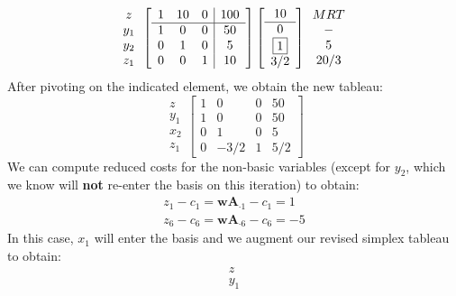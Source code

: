 \begin{example}
\begin{equation}
\begin{array}{c}
z\\
y_1\\
y_2\\
z_1
\end{array}
\left[
\begin{array}{ccc|c}
1	&	10	&	0	&	100\\
\hline
1	&	0	&	0	&	50\\
0	&	1	&	0	&	5\\
0	&	0	&	1	&	10
\end{array}
\right]
\left[
\begin{array}{c}
10\\
\hline
0\\
\fbox{1}\\
3/2
\end{array}
\right]
\begin{array}{c}
MRT\\
-\\
5\\
20/3
\end{array}
\end{equation}
After pivoting on the indicated element, we obtain the new tableau:
\begin{equation}
\begin{array}{c}
z\\
y_1\\
x_2\\
z_1
\end{array}
\left[
\begin{array}{ccc|c}
1	&	0	&	0	&	50\\
\hline
1	&	0	&	0	&	50\\
0	&	1	&	0	&	5\\
0	&	-3/2	&	1	&	5/2
\end{array}
\right]
\end{equation}
We can compute reduced costs for the non-basic variables (except for $y_2$, which we know will \textbf{not} re-enter the basis on this iteration) to obtain:
\begin{gather*}
z_1 - c_1 = \mathbf{w}\mathbf{A}_{\cdot 1} - c_1 = 1\\
z_6 - c_6 = \mathbf{w}\mathbf{A}_{\cdot 6} - c_6 = -5
\end{gather*}
In this case, $x_1$ will enter the basis and we augment our revised simplex tableau to obtain:
\begin{equation}
\begin{array}{c}
z\\
y_1\\

\end{array}
\end{equation}
\end{example}
